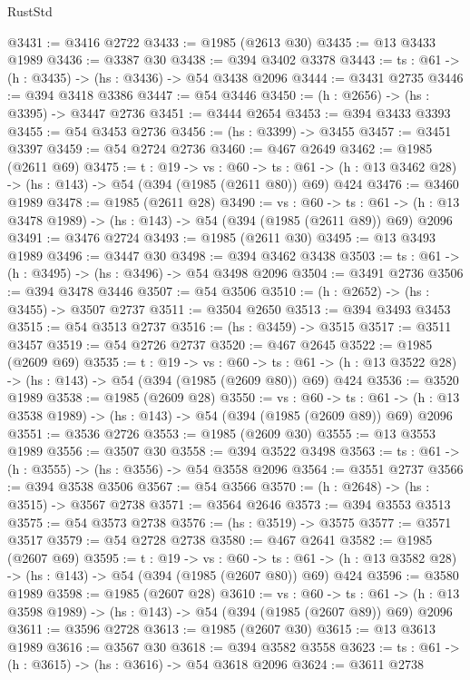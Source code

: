 \begin{lexlean}{RustStd}
\begin{coremodule}
{\begin{coremodule}
{{{{{{{{@3431 := @3416 @2722
@3433 := @1985 (@2613 @30)
@3435 := @13 @3433 @1989
@3436 := @3387 @30
@3438 := @394 @3402 @3378
@3443 := {ts : @61} -> (h : @3435) -> (hs : @3436) -> @54 @3438 @2096
@3444 := @3431 @2735
@3446 := @394 @3418 @3386
@3447 := @54 @3446
@3450 := (h : @2656) -> (hs : @3395) -> @3447 @2736
@3451 := @3444 @2654
@3453 := @394 @3433 @3393
@3455 := @54 @3453 @2736
@3456 := (hs : @3399) -> @3455
@3457 := @3451 @3397
@3459 := @54 @2724 @2736
@3460 := @467 @2649
@3462 := @1985 (@2611 @69)
@3475 := {t : @19} ->
  {vs : @60} ->
  {ts : @61} -> (h : @13 @3462 @28) -> (hs : @143) -> @54 (@394 (@1985 (@2611 @80)) @69) @424
@3476 := @3460 @1989
@3478 := @1985 (@2611 @28)
@3490 := {vs : @60} ->
  {ts : @61} -> (h : @13 @3478 @1989) -> (hs : @143) -> @54 (@394 (@1985 (@2611 @89)) @69) @2096
@3491 := @3476 @2724
@3493 := @1985 (@2611 @30)
@3495 := @13 @3493 @1989
@3496 := @3447 @30
@3498 := @394 @3462 @3438
@3503 := {ts : @61} -> (h : @3495) -> (hs : @3496) -> @54 @3498 @2096
@3504 := @3491 @2736
@3506 := @394 @3478 @3446
@3507 := @54 @3506
@3510 := (h : @2652) -> (hs : @3455) -> @3507 @2737
@3511 := @3504 @2650
@3513 := @394 @3493 @3453
@3515 := @54 @3513 @2737
@3516 := (hs : @3459) -> @3515
@3517 := @3511 @3457
@3519 := @54 @2726 @2737
@3520 := @467 @2645
@3522 := @1985 (@2609 @69)
@3535 := {t : @19} ->
  {vs : @60} ->
  {ts : @61} -> (h : @13 @3522 @28) -> (hs : @143) -> @54 (@394 (@1985 (@2609 @80)) @69) @424
@3536 := @3520 @1989
@3538 := @1985 (@2609 @28)
@3550 := {vs : @60} ->
  {ts : @61} -> (h : @13 @3538 @1989) -> (hs : @143) -> @54 (@394 (@1985 (@2609 @89)) @69) @2096
@3551 := @3536 @2726
@3553 := @1985 (@2609 @30)
@3555 := @13 @3553 @1989
@3556 := @3507 @30
@3558 := @394 @3522 @3498
@3563 := {ts : @61} -> (h : @3555) -> (hs : @3556) -> @54 @3558 @2096
@3564 := @3551 @2737
@3566 := @394 @3538 @3506
@3567 := @54 @3566
@3570 := (h : @2648) -> (hs : @3515) -> @3567 @2738
@3571 := @3564 @2646
@3573 := @394 @3553 @3513
@3575 := @54 @3573 @2738
@3576 := (hs : @3519) -> @3575
@3577 := @3571 @3517
@3579 := @54 @2728 @2738
@3580 := @467 @2641
@3582 := @1985 (@2607 @69)
@3595 := {t : @19} ->
  {vs : @60} ->
  {ts : @61} -> (h : @13 @3582 @28) -> (hs : @143) -> @54 (@394 (@1985 (@2607 @80)) @69) @424
@3596 := @3580 @1989
@3598 := @1985 (@2607 @28)
@3610 := {vs : @60} ->
  {ts : @61} -> (h : @13 @3598 @1989) -> (hs : @143) -> @54 (@394 (@1985 (@2607 @89)) @69) @2096
@3611 := @3596 @2728
@3613 := @1985 (@2607 @30)
@3615 := @13 @3613 @1989
@3616 := @3567 @30
@3618 := @394 @3582 @3558
@3623 := {ts : @61} -> (h : @3615) -> (hs : @3616) -> @54 @3618 @2096
@3624 := @3611 @2738
}}}}}}}}
\end{coremodule}}
\end{coremodule}
\end{lexlean}
